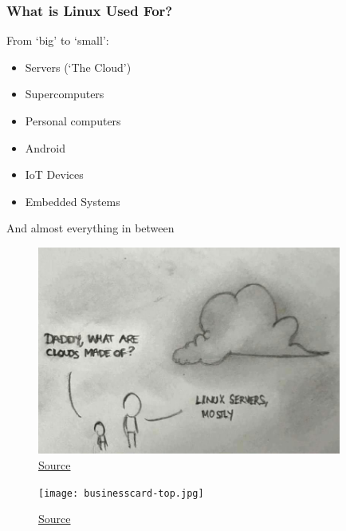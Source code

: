 \documentclass{beamer} \usetheme{Madrid}
\begin{document}
\begin{frame}
    \frametitle{What is Linux Used For?}
    \begin{center}
        From `big' to `small':
        \begin{itemize}
            \item Servers (`The Cloud')
            \item Supercomputers
            \item Personal computers
            \item Android
            \item IoT Devices
            \item Embedded Systems
        \end{itemize}
        And almost everything in between
    \end{center}
\end{frame}

\begin{frame}
    \begin{figure}
        \includegraphics[width=10cm]{cloud.jpg}
        \caption{\href{https://www.reddit.com/r/ProgrammerHumor/comments/6cer5t/what_are_clouds_made_of/}{Source}}
    \end{figure}
\end{frame}

\begin{frame}
    \begin{figure}
        \texttt{[image: businesscard-top.jpg]}
        \caption{\href{https://www.thirtythreeforty.net/posts/2019/12/designing-my-linux-business-card/}{Source}}
    \end{figure}
\end{frame}
\end{document}
